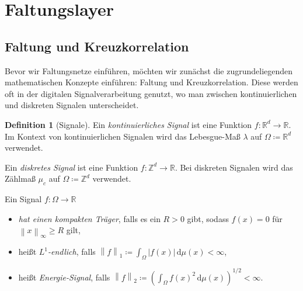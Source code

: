 \documentclass[paper=a4, 	%
		fontsize=11pt,
		abstract=true, 	%
		headsepline, 	%
		notitlepage	%
		]{scrartcl}
\theoremstyle{definition}
\newtheorem{definition}[theorem]{Definition}
\newcommand{\R}{\mathbb{R}}
\newcommand{\Z}{\mathbb{Z}}
\newcommand{\diff}{\,\textrm{d}}
\newcommand{\norm}[1]{\left\lVert#1\right\rVert}
\newcommand{\abs}[1]{\left\lvert#1\right\rvert}
\begin{document}
\section{Faltungslayer}

\subsection{Faltung und Kreuzkorrelation}\label{subsec:convolution}

Bevor wir Faltungsnetze einführen, möchten wir zunächst die zugrundeliegenden mathematischen Konzepte einführen:
Faltung und Kreuzkorrelation.
Diese werden oft in der digitalen Signalverarbeitung genutzt, wo man zwischen kontinuierlichen und diskreten Signalen unterscheidet.

\newcommand{\llambda}{\lambda}
\newcommand{\cmeasure}{\mu_c}

\begin{definition}[Signale]
    Ein \emph{kontinuierliches Signal} ist eine Funktion $f: \R^d\rightarrow \R$.
    Im Kontext von kontinuierlichen Signalen wird das Lebesgue-Maß $\llambda$ auf $\Omega\coloneqq \R^d$ verwendet.

    Ein \emph{diskretes Signal} ist eine Funktion $f: \Z^d \rightarrow \R$.
    Bei diskreten Signalen wird das Zählmaß $\cmeasure$ auf $\Omega\coloneqq \Z^d$ verwendet.

    Ein Signal $f: \Omega \rightarrow \R$
    \begin{itemize}
        \item \emph{hat einen kompakten Träger}, falls es ein $R > 0$ gibt, sodass $f(x) = 0$ für $\norm{x}_\infty \geq R$ gilt,
        \item heißt \emph{$L^1$-endlich}, falls $\norm{f}_1 \coloneqq \int_{\Omega} \abs{f(x)} \diff \mu(x) < \infty$,
        \item heißt \emph{Energie-Signal}, falls $\norm{f}_2 \coloneqq \left(\int_{\Omega} f(x)^2 \diff \mu(x) \right)^{1/2} < \infty$.
    \end{itemize}
\end{definition}
\end{document}

